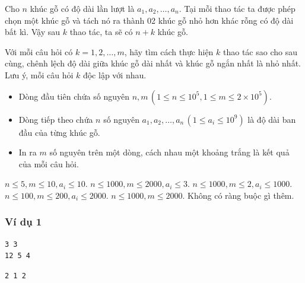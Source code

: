 
\noindent Cho $n$ khúc gỗ có độ dài lần lượt là $a_1, a_2, \dots, a_n$. Tại mỗi thao tác ta được phép chọn một khúc gỗ và tách nó ra thành 02 khúc gỗ nhỏ hơn khác rỗng có độ dài bất kì. Vậy sau $k$ thao tác, ta sẽ có $n+k$ khúc gỗ.

\noindent Với mỗi câu hỏi có $k = 1, 2, \dots, m$, hãy tìm cách thực hiện $k$ thao tác sao cho sau cùng, chênh lệch độ dài giữa khúc gỗ dài nhất và khúc gỗ ngắn nhất là nhỏ nhất. Lưu ý, mỗi câu hỏi $k$ độc lập với nhau.

\begin{itemize}
    \item Dòng đầu tiên chứa số nguyên $n, m \, (1 \le n \le 10^{5}, 1 \le m \le 2 \times 10^{5})$.
    \item Dòng tiếp theo chứa $n$ số nguyên $a_1, a_2, \dots, a_n \, (1 \le a_i \le 10^{9})$ là độ dài ban đầu của từng khúc gỗ.
\end{itemize}

\begin{itemize}
    \item In ra $m$ số nguyên trên một dòng, cách nhau một khoảng trắng là kết quả của mỗi câu hỏi.
\end{itemize}

\begin{makesubtasks}
     $n \le 5, m \le 10, a_i \le 10$.
     $n \le 1000, m \le 2000, a_i \le 3$.
     $n \le 1000, m \le 2, a_i \le 1000$.
     $n \le 100, m \le 200, a_i \le 2000$.
     $n \le 1000, m \le 2000$.
     Không có ràng buộc gì thêm.
\end{makesubtasks}


\subsubsection*{Ví dụ 1}
\begin{makesample}
\begin{lstlisting}
3 3
12 5 4
\end{lstlisting}
\nextsample
\begin{lstlisting}
2 1 2
\end{lstlisting}
\end{makesample}
